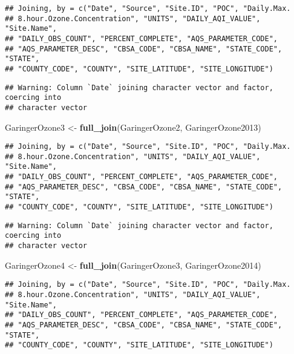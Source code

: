 \documentclass[
]{article}
\newenvironment{Shaded}{\begin{snugshade}}{\end{snugshade}}
\newcommand{\KeywordTok}[1]{\textcolor[rgb]{0.13,0.29,0.53}{\textbf{#1}}}
\newcommand{\NormalTok}[1]{#1}
\newcommand{\StringTok}[1]{\textcolor[rgb]{0.31,0.60,0.02}{#1}}
\begin{document}
\begin{verbatim}
## Joining, by = c("Date", "Source", "Site.ID", "POC", "Daily.Max.
## 8.hour.Ozone.Concentration", "UNITS", "DAILY_AQI_VALUE", "Site.Name",
## "DAILY_OBS_COUNT", "PERCENT_COMPLETE", "AQS_PARAMETER_CODE",
## "AQS_PARAMETER_DESC", "CBSA_CODE", "CBSA_NAME", "STATE_CODE", "STATE",
## "COUNTY_CODE", "COUNTY", "SITE_LATITUDE", "SITE_LONGITUDE")
\end{verbatim}

\begin{verbatim}
## Warning: Column `Date` joining character vector and factor, coercing into
## character vector
\end{verbatim}

\begin{Shaded}
\begin{Highlighting}[]
\NormalTok{GaringerOzone3 <-}\StringTok{ }\KeywordTok{full_join}\NormalTok{(GaringerOzone2, GaringerOzone2013)}
\end{Highlighting}
\end{Shaded}

\begin{verbatim}
## Joining, by = c("Date", "Source", "Site.ID", "POC", "Daily.Max.
## 8.hour.Ozone.Concentration", "UNITS", "DAILY_AQI_VALUE", "Site.Name",
## "DAILY_OBS_COUNT", "PERCENT_COMPLETE", "AQS_PARAMETER_CODE",
## "AQS_PARAMETER_DESC", "CBSA_CODE", "CBSA_NAME", "STATE_CODE", "STATE",
## "COUNTY_CODE", "COUNTY", "SITE_LATITUDE", "SITE_LONGITUDE")
\end{verbatim}

\begin{verbatim}
## Warning: Column `Date` joining character vector and factor, coercing into
## character vector
\end{verbatim}

\begin{Shaded}
\begin{Highlighting}[]
\NormalTok{GaringerOzone4 <-}\StringTok{ }\KeywordTok{full_join}\NormalTok{(GaringerOzone3, GaringerOzone2014)}
\end{Highlighting}
\end{Shaded}

\begin{verbatim}
## Joining, by = c("Date", "Source", "Site.ID", "POC", "Daily.Max.
## 8.hour.Ozone.Concentration", "UNITS", "DAILY_AQI_VALUE", "Site.Name",
## "DAILY_OBS_COUNT", "PERCENT_COMPLETE", "AQS_PARAMETER_CODE",
## "AQS_PARAMETER_DESC", "CBSA_CODE", "CBSA_NAME", "STATE_CODE", "STATE",
## "COUNTY_CODE", "COUNTY", "SITE_LATITUDE", "SITE_LONGITUDE")
\end{verbatim}
\end{document}
